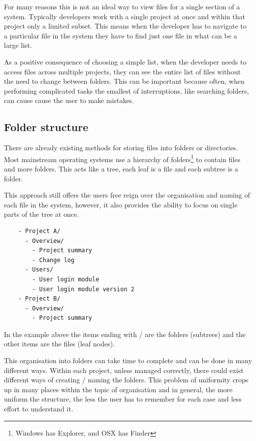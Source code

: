 For many reasons this is not an ideal way to view files for a single section of
a system. Typically developers work with a single project at once and within
that project only a limited subset. This means when the developer has to
navigate to a particular file in the system they have to find just one file in
what can be a large list.


As a positive consequence of choosing a simple list, when the developer needs to
access files across multiple projects, they can see the entire list of files
without the need to change between folders. This can be important because
often, when performing complicated tasks the smallest of interruptions, like 
searching folders, can cause cause the user to make mistakes.

\subsection{Folder structure}\label{folder-structure-i.e.explorer-finder}

There are already existing methods for storing files into folders or
directories. Most mainstream operating systems use a hierarchy of
folders\footnote{Windows has Explorer, and OSX has Finder} to contain files
and more folders. This acts like a tree, each leaf is a file and each subtree
is a folder.

This approach still offers the users free reign over the organisation
and naming of each file in the system, however, it also provides the
ability to focus on single parts of the tree at once.

\begin{verbatim}
    - Project A/
      - Overview/
        - Project summary
        - Change log
      - Users/
        - User login module
        - User login module version 2
    - Project B/
      - Overview/
        - Project summary
\end{verbatim}

In the example above the items ending with / are the folders (subtrees) and the
other items are the files (leaf nodes).

This organisation into folders can take time to complete and can be done in many
different ways. Within each project, unless managed correctly, there could exist
different ways of creating / naming the folders. This problem of uniformity
crops up in many places within the topic of organisation and in general, the
more uniform the structure, the less the user has to remember for each case and
less effort to understand it.


